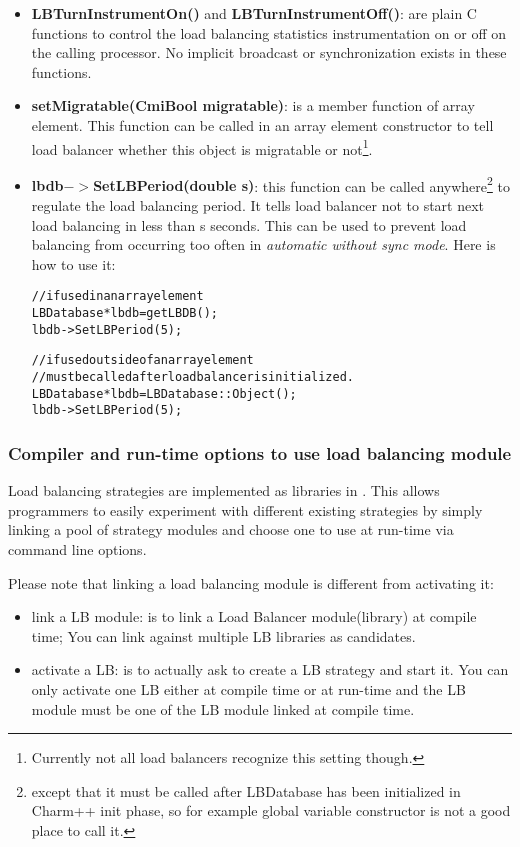 \begin{itemize}
\item {\bf LBTurnInstrumentOn()} and {\bf LBTurnInstrumentOff()}: are plain C
      functions to control the load balancing statistics instrumentation
      on or off on the calling processor. No implicit broadcast or 
      synchronization exists in these functions.
\item {\bf setMigratable(CmiBool migratable)}: is a member function of array
      element. This function can be called 
      in an array element constructor to tell load balancer whether this object
      is migratable or not\footnote{Currently not all load balancers 
      recognize this setting though.}.
\item {\bf lbdb$->$SetLBPeriod(double s)}: this function can be called
      anywhere\footnote{except that it must be called after LBDatabase
      has been initialized in Charm++ init phase, so for example global 
      variable constructor is not a good place to call it.} to regulate 
      the load balancing period. It tells load balancer not to start next 
      load balancing in less than s seconds. This can be used to prevent 
      load balancing from occurring too often in 
      {\em automatic without sync mode}. Here is how to use it:
      \begin{alltt}
// if used in an array element
LBDatabase *lbdb = getLBDB();
lbdb->SetLBPeriod(5);

// if used outside of an array element
// must be called after load balancer is initialized.
LBDatabase *lbdb = LBDatabase::Object();
lbdb->SetLBPeriod(5);
\end{alltt}
\end{itemize}

\subsubsection{Compiler and run-time options to use load balancing module}
\label{lbOption}

Load balancing strategies are implemented as libraries in \charmpp{}. This
allows programmers to easily experiment with different existing strategies 
by simply linking a pool of strategy modules and choose 
one to use at run-time via command line options.

Please note that linking a load balancing module is different from activating it:
\begin{itemize}
\item link a LB module: is to link a Load Balancer module(library) at 
   compile time; You can link against multiple LB libraries as candidates.
\item activate a LB: is to actually ask to create a LB strategy and 
   start it. You can only activate one LB either at compile time or at
   run-time and the LB module must be one of the LB module linked at 
   compile time.
\end{itemize}


